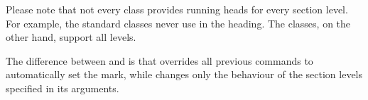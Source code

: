   Please note that not every class provides running heads
  for every section level. For example, the standard classes never use 
  in the heading. The \KOMAScript{} classes, on the other hand, support all
  levels.

  The difference between  and %
   is that  overrides all
  previous commands to automatically set the mark, while 
  changes only the behaviour of the section levels specified in its
  arguments.%
    \iffalse%
      \iffree{}{\par
        The obsolete package
        \Package{scrpage2}\IndexPackage{scrpage2}\important{\Package{scrpage2}}
        understands both \Macro{manualmark} and \Macro{automark}, but not
        \Macro{automark*}. Therefore the following examples are not completely
        transferable when using \Package{scrpage2}.%
      }%
    \fi
